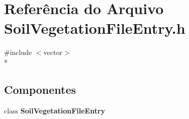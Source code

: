 \section{Referência do Arquivo Soil\+Vegetation\+File\+Entry.\+h}
\label{_soil_vegetation_file_entry_8h}
{\ttfamily \#include $<$vector$>$}\\*
\subsection*{Componentes}
\begin{DoxyCompactItemize}
\item 
class {\bf Soil\+Vegetation\+File\+Entry}
\end{DoxyCompactItemize}

